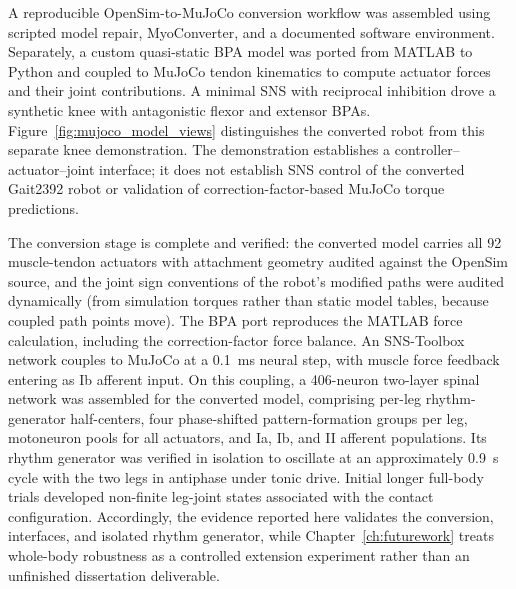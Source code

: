 A reproducible OpenSim-to-MuJoCo conversion workflow was assembled using scripted model repair, MyoConverter, and a documented software environment. Separately, a custom quasi-static BPA model was ported from MATLAB to Python and coupled to MuJoCo tendon kinematics to compute actuator forces and their joint contributions. A minimal SNS with reciprocal inhibition drove a synthetic knee with antagonistic flexor and extensor BPAs. Figure~\ref{fig:mujoco_model_views} distinguishes the converted robot from this separate knee demonstration. The demonstration establishes a controller--actuator--joint interface; it does not establish SNS control of the converted Gait2392 robot or validation of correction-factor-based MuJoCo torque predictions.

The conversion stage is complete and verified: the converted model carries all 92 muscle-tendon actuators with attachment geometry audited against the OpenSim source, and the joint sign conventions of the robot's modified paths were audited dynamically (from simulation torques rather than static model tables, because coupled path points move). The BPA port reproduces the MATLAB force calculation, including the correction-factor force balance. An SNS-Toolbox network couples to MuJoCo at a \qty{0.1}{\milli\second} neural step, with muscle force feedback entering as Ib afferent input. On this coupling, a 406-neuron two-layer spinal network was assembled for the converted model, comprising per-leg rhythm-generator half-centers, four phase-shifted pattern-formation groups per leg, motoneuron pools for all actuators, and Ia, Ib, and II afferent populations. Its rhythm generator was verified in isolation to oscillate at an approximately \qty{0.9}{\second} cycle with the two legs in antiphase under tonic drive. Initial longer full-body trials developed non-finite leg-joint states associated with the contact configuration. Accordingly, the evidence reported here validates the conversion, interfaces, and isolated rhythm generator, while Chapter~\ref{ch:futurework} treats whole-body robustness as a controlled extension experiment rather than an unfinished dissertation deliverable.

